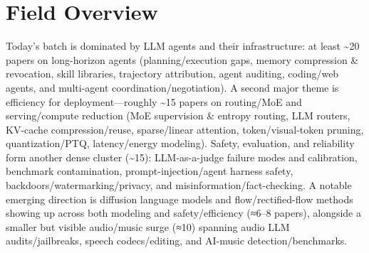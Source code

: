 \documentclass[12pt,letterpaper]{article}
\begin{document}
\medskip



\section*{Field Overview}
{\footnotesize Today's batch is dominated by LLM agents and their infrastructure: at least \textasciitilde{}20 papers on long-horizon agents (planning/execution gaps, memory compression \& revocation, skill libraries, trajectory attribution, agent auditing, coding/web agents, and multi-agent coordination/negotiation). A second major theme is efficiency for deployment---roughly \textasciitilde{}15 papers on routing/MoE and serving/compute reduction (MoE supervision \& entropy routing, LLM routers, KV-cache compression/reuse, sparse/linear attention, token/visual-token pruning, quantization/PTQ, latency/energy modeling). Safety, evaluation, and reliability form another dense cluster (\textasciitilde{}15): LLM-as-a-judge failure modes and calibration, benchmark contamination, prompt-injection/agent harness safety, backdoors/watermarking/privacy, and misinformation/fact-checking. A notable emerging direction is diffusion language models and flow/rectified-flow methods showing up across both modeling and safety/efficiency (≈6--8 papers), alongside a smaller but visible audio/music surge (≈10) spanning audio LLM audits/jailbreaks, speech codecs/editing, and AI-music detection/benchmarks.}
\end{document}

